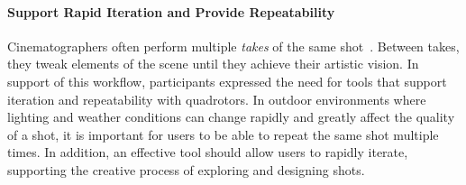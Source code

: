 \paragraph{Support Rapid Iteration and Provide Repeatability} 
Cinematographers often perform multiple \emph{takes} of the same shot~\cite{mascelli:1965}.
Between takes, they tweak elements of the scene until they achieve their artistic vision.
In support of this workflow, participants expressed the need for tools that support iteration and repeatability with quadrotors. 
In outdoor environments where lighting and weather conditions can change rapidly and greatly affect the quality of a shot, it is important for users to be able to repeat the same shot multiple times. 
In addition, an effective tool should allow users to rapidly iterate, supporting the creative process of exploring and designing shots.

